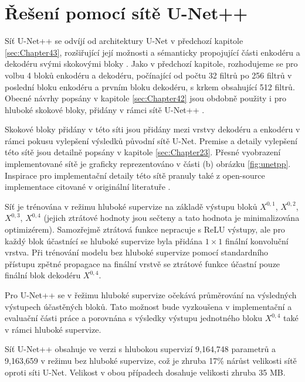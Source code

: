\section{Řešení pomocí sítě U-Net++}
\label{sec:Chapter44}
Síť U-Net++ se odvíjí od architektury U-Net v předchozí kapitole \ref{sec:Chapter43}, rozšiřující její možnosti a sémanticky propojující části enkodéru a dekodéru svými skokovými bloky \cite{unetpp}. Jako v předchozí kapitole, rozhodujeme se pro volbu 4 bloků enkodéru a dekodéru, počínající od počtu 32 filtrů po 256 filtrů v poslední bloku enkodéru a prvním bloku dekodéru, s krkem obsahující 512 filtrů. Obecné návrhy popsány v kapitole \ref{sec:Chapter42} jsou obdobně použity i pro hluboké skokové bloky, přidány v rámci sítě U-Net++ \cite{unetpp}.

Skokové bloky přidány v této síti jsou přidány mezi vrstvy dekodéru a enkodéru v rámci pokusu vylepšení výsledků původní sítě U-Net. Premise a detaily vylepšení této sítě jsou detailně popsány v kapitole \ref{sec:Chapter23}. Přesné vyobrazení implementované sítě je graficky reprezentováno v části (b) obrázku \ref{fig:unetpp}. Inspirace pro implementační detaily této sítě pranuly také z open-source implementace citované v originální literatuře \cite{unetpp_github}.

Síť je trénována v režimu hluboké supervize na základě výstupu bloků $X^{0,1}$, $X^{0,2}$, $X^{0,3}$, $X^{0,4}$ (jejich ztrátové hodnoty jsou sečteny a tato hodnota je minimalizována optimizérem). Samozřejmě ztrátová funkce nepracuje s ReLU výstupy, ale pro každý blok účastnící se hluboké supervize byla přidána $1\times1$ finální konvoluční vrstva. Při trénování modelu bez hluboké supervize pomocí standardního přístupu zpětné propagace na finální vrstvě se ztrátové funkce účastní pouze finální blok dekodéru $X^{0, 4}$.

Pro U-Net++ se v řežimu hluboké supervize očekává průměrování na výsledných výstupech účastěných bloků. Tato možnost bude vyzkoušena v implementační a evaluační části práce a porovnána s výsledky výstupu jednotného bloku $X^{0, 4}$ také v rámci hluboké supervize.

Síť U-Net++ obsahuje ve verzi s hlubokou supervizí 9,164,748 parametrů a 9,163,659 v režimu bez hluboké supervize, což je zhruba 17\% nárůst velikosti sítě oproti síti U-Net. Velikost v obou případech dosahuje velikosti zhruba 35 MB.
\endinput